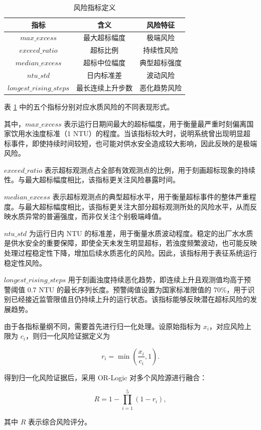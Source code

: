 \documentclass[UTF8,zihao=-4]{ctexart}
\begin{document}
\begin{table}[H]
\centering
\caption{风险指标定义}
\begin{tabular}{ccc}
\toprule
指标 & 含义 & 风险特征 \\
\midrule
$max\_excess$ & 最大超标幅度 & 极端风险 \\
$exceed\_ratio$ & 超标比例 & 持续性风险 \\
$median\_excess$ & 超标中位幅度 & 典型超标强度 \\
$ntu\_std$ & 日内标准差 & 波动风险 \\
$longest\_rising\_steps$ & 最长连续上升步数 & 恶化趋势风险 \\
\bottomrule
\end{tabular}
\label{tab:risk_indicators}
\end{table}

表 \ref{tab:risk_indicators} 中的五个指标分别对应水质风险的不同表现形式。

其中，$max\_excess$ 表示运行日期间最大的超标幅度，用于衡量最严重时刻偏离国家饮用水浊度标准（1 NTU）的程度。当该指标较大时，说明系统曾出现明显超标事件，即使持续时间较短，也可能对供水安全造成较大影响，因此反映的是极端风险。

$exceed\_ratio$ 表示超标观测点占全部有效观测点的比例，用于刻画超标现象的持续性。与最大超标幅度相比，该指标更关注风险暴露时间。

$median\_excess$ 表示超标观测点的典型超标水平，用于衡量超标事件的整体严重程度。与最大超标幅度相比，该指标更关注大部分超标观测所处的风险水平，从而反映水质异常的普遍强度，而非仅关注个别极端峰值。

$ntu\_std$ 为运行日内 NTU 的标准差，用于衡量水质波动程度。稳定的出厂水水质是供水安全的重要保障，即使全天未发生明显超标，若浊度频繁波动，也可能反映处理过程稳定性下降，增加后续水质恶化的风险。因此，该指标用于表征系统运行稳定性风险。

$longest\_rising\_steps$ 用于刻画浊度持续恶化趋势，即连续上升且观测值均高于预警阈值 0.7 NTU 的最长序列长度。预警阈值设置为国家标准限值的 70\%，用于识别已经接近监管限值且仍持续上升的运行状态。该指标能够反映潜在超标风险的发展趋势。

由于各指标量纲不同，需要首先进行归一化处理。设原始指标为 $x_i$，对应风险上限为 $c_i$，则归一化风险证据定义为

\[
r_i=\min\left(\frac{x_i}{c_i},1\right).
\]

得到归一化风险证据后，采用 OR-Logic 对多个风险源进行融合：

\[
R
=
1-\prod_{i=1}^{5}(1-r_i),
\]

其中 $R$ 表示综合风险评分。
\end{document}
